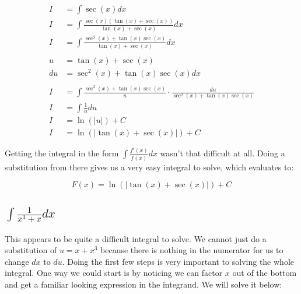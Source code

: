 \documentclass[12pt]{article}
\begin{document}
\begin{align}
    I  & = \int \sec(x) dx                                                                   \\
    I  & = \int \frac{\sec(x)(\tan(x)+\sec(x))}{\tan(x)+\sec(x)} dx                          \\
    I  & = \int \frac{\sec^2(x)+\tan(x)\sec(x)}{\tan(x)+\sec(x)} dx                          \\
    \nonumber                                                                                \\
    u  & = \tan(x)+\sec(x)                                                                   \\
    du & = \sec^2(x)+\tan(x)\sec(x) dx                                                       \\
    \nonumber                                                                                \\
    I  & = \int \frac{\sec^2(x)+\tan(x)\sec(x)}{u} \cdot \frac{du}{\sec^2(x)+\tan(x)\sec(x)} \\
    I  & = \int \frac{1}{u} du                                                               \\
    I  & = \ln(|u|) + C                                                                      \\
    I  & = \ln(|\tan(x)+\sec(x)|) + C
\end{align}


Getting the integral in the form $\int \frac{f'(x)}{f(x)} dx$ wasn't that difficult at all. Doing a substitution from there gives us a very easy integral to solve, which evaluates to:

$$
    F(x) = \ln(|\tan(x)+\sec(x)|) + C
$$

\subsection{$\int \frac{1}{x^3+x} dx$}

This appears to be quite a difficult integral to solve.
We cannot just do a substitution of $u=x+x^3$ because there is nothing in the numerator for us to change $dx$ to $du$.
Doing the first few steps is very important to solving the whole integral.
One way we could start is by noticing we can factor $x$ out of the bottom and get a familiar looking expression in the integrand.
We will solve it below:
\end{document}
